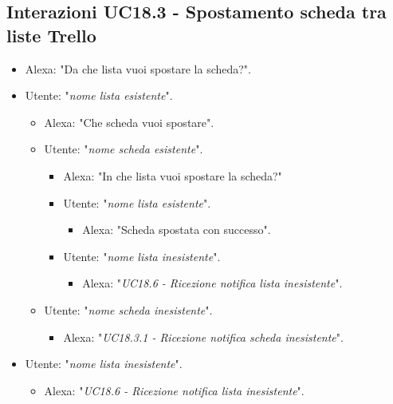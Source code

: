 \subsection{Interazioni  UC18.3 - Spostamento scheda tra liste Trello}
\label{sec:connettore_trello_sposta_scheda}
 \begin{itemize}
        \item Alexa: "Da che lista vuoi spostare la scheda?".
        \item Utente: "{\it nome lista esistente}".
        \begin{itemize}
        \item Alexa: "Che scheda vuoi spostare".
       
        \item Utente: "{\it nome scheda esistente}".
        \begin{itemize}
        \item Alexa: "In che lista vuoi spostare la scheda?"
          \item Utente: "{\it nome lista esistente}".
          \begin{itemize}
              \item Alexa: "Scheda spostata con successo".
          \end{itemize}
           \item Utente: "{\it nome lista inesistente}".
           \begin{itemize}
        \item Alexa: "{\it UC18.6 - Ricezione notifica lista inesistente}".
        \end{itemize}
      \end{itemize}
      
     \item Utente: "{\it nome scheda inesistente}".
     \begin{itemize}
           \item Alexa: "{\it UC18.3.1 - Ricezione notifica scheda inesistente}".
           \end{itemize}
            \end{itemize}
        \item Utente: "{\it nome lista inesistente}".
           \begin{itemize}
        \item Alexa: "{\it UC18.6 - Ricezione notifica lista inesistente}".
           \end{itemize}
    \end{itemize}
